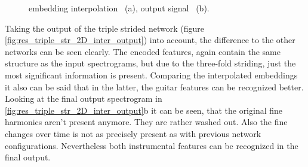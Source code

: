 \begin{figure}[htb!]
    \centering
    \caption{embedding interpolation ~(a), output signal ~(b).}
    \label{fig:res_double_str_2D_inter_output}
\end{figure}

Taking the output of the triple strided network (figure \ref{fig:res_triple_str_2D_inter_output}) into account, the difference to the other networks can be seen clearly. The encoded features, again contain the same structure as the input spectrograms, but due to the three-fold striding, just the most significant information is present. Comparing the interpolated embeddings it also can be said that in the latter, the guitar features can be recognized better. Looking at the final output spectrogram in \ref{fig:res_triple_str_2D_inter_output}b it can be seen, that the original fine harmonics aren't present anymore. They are rather washed out. Also the fine changes over time is not as precisely present as with previous network configurations. Nevertheless both instrumental features can be recognized in the final output. 


